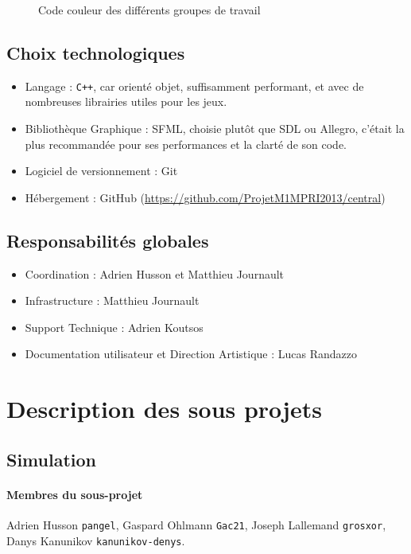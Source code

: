 \documentclass[a4paper,10pt]{article}
\begin{document}
\begin{figure}[h]
\centering
{}
 \caption{Code couleur des différents groupes de travail}
\end{figure}
\subsection{Choix technologiques}
\begin{itemize}
 \item Langage : \verb!C++!, car orienté objet, suffisamment performant, et avec de nombreuses librairies utiles pour les jeux.
 \item Bibliothèque Graphique : SFML, choisie plutôt que SDL ou Allegro, c'était la plus recommandée pour ses performances et la clarté de son code.
 \item Logiciel de versionnement : Git
 \item Hébergement : GitHub (\href{https://github.com/ProjetM1MPRI2013/central}{https://github.com/ProjetM1MPRI2013/central})
\end{itemize}
\subsection{Responsabilités globales}
\begin{itemize}
 \item Coordination : Adrien Husson et Matthieu Journault
 \item Infrastructure : Matthieu Journault
 \item Support Technique : Adrien Koutsos
 \item Documentation utilisateur et Direction Artistique : Lucas Randazzo
\end{itemize}

\section{Description des sous projets}
\subsection{Simulation}
\paragraph{Membres du sous-projet} Adrien Husson \verb!pangel!, Gaspard Ohlmann \verb!Gac21!, Joseph Lallemand \verb!grosxor!, Danys Kanunikov \verb!kanunikov-denys!.
\end{document}
